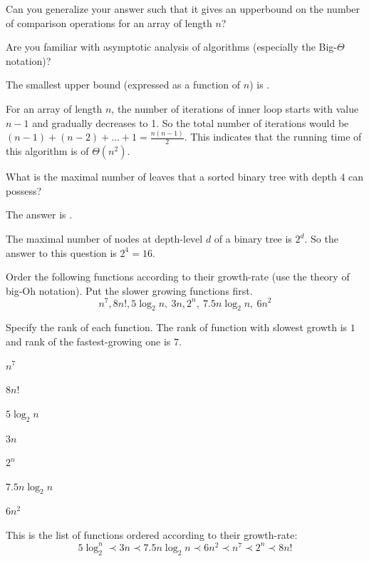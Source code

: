 \documentclass{ximera}
\begin{document}
\begin{question}
Can you generalize your answer such that it gives an upperbound on the
number of comparison operations for an array of length $n$?
\begin{solution}
\begin{hint}
Are you familiar with asymptotic analysis of algorithms (especially
the Big-$\Theta$ notation)?
\end{hint}
The smallest upper bound (expressed as a function of $n$) is
.
\end{solution}
For an array of length $n$, the number of iterations of inner loop
starts with value $n-1$ and gradually decreases to 1. So the total
number of iterations would be $(n-1) + (n-2) + \ldots + 1 =
\frac{n(n-1)}{2}$. This indicates that the running time of this
algorithm is of $\Theta(n^2)$.
\end{question}


\begin{question}
What is the maximal number of leaves that a sorted binary tree with depth $4$ can possess?
\begin{solution}
The answer is .
\end{solution}
The maximal number of nodes at depth-level $d$ of a binary tree is $2^d$. So the answer to this question is $2^4 = 16$. 
\end{question}

\begin{question}
Order the following functions according to their growth-rate (use the theory of big-Oh notation). Put the slower growing functions first.
\[
n^7, 8n!, 5 \log_2 n,~ 3n, 2^n, ~ 7.5 n\log_2 n, ~ 6 n^2
\]
\begin{solution}
Specify the rank of each function. The rank of function with slowest growth is $1$ and rank of the fastest-growing one is $7$.
\begin{question}
$n^7$  
\end{question}
\begin{question}
$8n!$  
\end{question}
\begin{question}
$5 \log_2 n$  
\end{question}
\begin{question}
$3n$  
\end{question}
\begin{question}
$2^n$   
\end{question}
\begin{question}
$7.5 n \log_2 n$   
\end{question}
\begin{question}
$6 n^2$ 
\end{question}

\end{solution}

This is the list of functions ordered according to their growth-rate:
\begin{equation*}
5 \log_2^n \prec 3n \prec 7.5 n \log_2{n} \prec 6n^2 \prec n^7 \prec 2^n \prec 8n!
\end{equation*}
\end{question}
\end{document}
